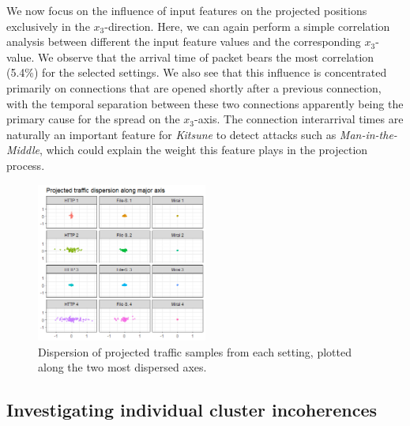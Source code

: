 \documentclass[conference]{IEEEtran}
\begin{document}
We now focus on the influence of input features on the projected positions exclusively in the $x_3$-direction. Here, we can again perform a simple correlation analysis between different the input feature values and the corresponding $x_3$-value. We observe that the arrival time of packet bears the most correlation (5.4\%) for the selected settings. We also see that this influence is concentrated primarily on connections that are opened shortly after a previous connection, with the temporal separation between these two connections apparently being the primary cause for the spread on the $x_3$-axis. The connection interarrival times are naturally an important feature for \textit{Kitsune} to detect attacks such as \textit{Man-in-the-Middle}, which could explain the weight this feature plays in the projection process.



\begin{figure}
\centering
\includegraphics[width=0.5\textwidth]{images/traffic_dispersion.png}
\caption{Dispersion of projected traffic samples from each setting, plotted along the two most dispersed axes.}\label{fig:Subspace_disp}
\end{figure}



\subsection{Investigating individual cluster incoherences}
\end{document}

